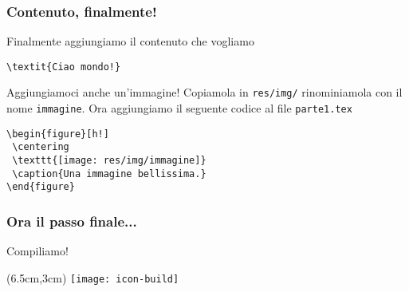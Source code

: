 \begin{frame}[fragile]
 
 \frametitle{Contenuto, finalmente!}
 
 Finalmente aggiungiamo il contenuto che vogliamo
 
 \begin{lstlisting}[frame = single, title={File res/sections/parte1.tex}]
\textit{Ciao mondo!}
 \end{lstlisting}
 
 Aggiungiamoci anche un'immagine!
 Copiamola in \texttt{res/img/} rinominiamola con il nome \texttt{immagine}. 
Ora aggiungiamo il seguente codice al file \texttt{parte1.tex}

 \begin{lstlisting}[frame = single]
\begin{figure}[h!]
 \centering
 \texttt{[image: res/img/immagine]}
 \caption{Una immagine bellissima.}
\end{figure}
 \end{lstlisting}


\end{frame}

\begin{frame}
 \frametitle{Ora il passo finale...}
 
 \huge Compiliamo!
 
 
 \begin{textblock*}{5cm}(6.5cm,3cm)
   \texttt{[image: icon-build]}
 \end{textblock*}
\end{frame}
